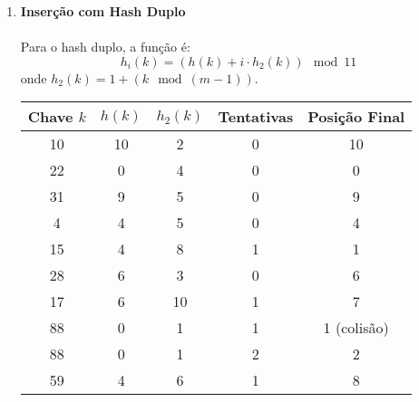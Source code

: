 \documentclass{article}
\begin{document}
\begin{enumerate}[label=\alph*)]
  \item \textbf{Inserção com Hash Duplo}
  \\\\
    Para o hash duplo, a função é:
    \[
    h_i(k) = (h(k) + i \cdot h_2(k)) \mod 11
    \]
    onde \(h_2(k) = 1 + (k \mod (m - 1))\).

    \begin{center}
    \begin{tabular}{|c|c|c|c|c|}
    \hline
    Chave \(k\) & \(h(k)\) & \(h_2(k)\) & Tentativas & Posição Final \\
    \hline
    10 & 10 & 2 & 0 & 10 \\
    22 & 0 & 4 & 0 & 0 \\
    31 & 9 & 5 & 0 & 9 \\
    4 & 4 & 5 & 0 & 4 \\
    15 & 4 & 8 & 1 & 1 \\
    28 & 6 & 3 & 0 & 6 \\
    17 & 6 & 10 & 1 & 7 \\
    88 & 0 & 1 & 1 & 1 (colisão) \\
    88 & 0 & 1 & 2 & 2 \\
    59 & 4 & 6 & 1 & 8 \\
    \hline
    \end{tabular}
    \end{center}
\end{enumerate}
\end{document}
